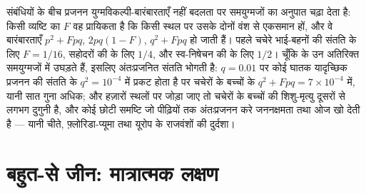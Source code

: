 \begin{proposition}[अंतःप्रजनन]\label{prop:b2:population-genetics:inbreeding}
संबंधियों के बीच प्रजनन युग्मविकल्पी-बारंबारताएँ नहीं बदलता पर
समयुग्मजों का अनुपात चढ़ा देता है: किसी व्यष्टि का
\emph{} $F$ वह प्रायिकता है कि किसी स्थल पर उसके दोनों
 वंश से एकसमान हों, और वे 
बारंबारताएँ $p^{2} + Fpq$, $2pq(1 - F)$, $q^{2} + Fpq$ हो जाती हैं।
पहले चचेरे भाई-बहनों की संतति के लिए $F = 1/16$, सहोदरों की के लिए $1/4$, और
स्व-निषेचन की के लिए $1/2$। चूँकि  के  
उन अतिरिक्त समयुग्मजों में उघड़ते हैं, इसलिए अंतःप्रजनित संतति
\emph{} भोगती है: $q = 0.01$ पर कोई घातक 
यादृच्छिक प्रजनन की संतति के $q^{2} = 10^{-4}$ में प्रकट होता है पर
चचेरों के बच्चों के $q^{2} + Fpq = 7\times 10^{-4}$ में, यानी सात गुना अधिक;
और हज़ारों स्थलों पर जोड़ा जाए तो चचेरों के बच्चों की शिशु-मृत्यु दूसरों से लगभग
दुगुनी है, और कोई छोटी समष्टि जो पीढ़ियों तक अंतःप्रजनन करे
जननक्षमता तथा ओज खो देती है --- यानी चीते, फ़्लोरिडा-प्यूमा
तथा यूरोप के राजवंशों की दुर्दशा।
\end{proposition}

\section{बहुत-से जीन: मात्रात्मक लक्षण}

